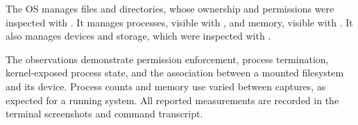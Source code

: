 \documentclass{../latex/utmreport}
\begin{document}
\utmconclusions
The OS manages files and directories, whose ownership and permissions were
inspected with . It manages processes, visible with ,
and memory, visible with . It also manages devices and storage,
which were inspected with .

The observations demonstrate permission enforcement, process termination,
kernel-exposed process state, and the association between a mounted
filesystem and its device. Process counts and memory use varied between
captures, as expected for a running system. All reported measurements are
recorded in the terminal screenshots and command transcript.
\end{document}
